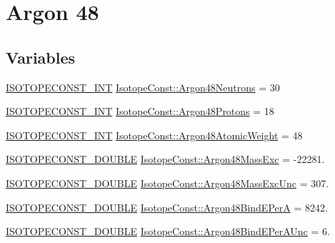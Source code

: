 \hypertarget{group___isotope_const-_argon-_ar48}{}\section{Argon 48}
\label{group___isotope_const-_argon-_ar48}
\subsection*{Variables}
\begin{DoxyCompactItemize}
\item 
\mbox{\hyperlink{group___isotope_const-_macros_ga5f18360b3e99483a35c32d789e62621c}{I\+S\+O\+T\+O\+P\+E\+C\+O\+N\+S\+T\+\_\+\+I\+NT}} \mbox{\hyperlink{group___isotope_const-_argon-_ar48_gad60127c6b7b8150efa4f4d6e5371e982}{Isotope\+Const\+::\+Argon48\+Neutrons}} = 30
\item 
\mbox{\hyperlink{group___isotope_const-_macros_ga5f18360b3e99483a35c32d789e62621c}{I\+S\+O\+T\+O\+P\+E\+C\+O\+N\+S\+T\+\_\+\+I\+NT}} \mbox{\hyperlink{group___isotope_const-_argon-_ar48_ga970cd0a221ec47e15054ea664ed58d0b}{Isotope\+Const\+::\+Argon48\+Protons}} = 18
\item 
\mbox{\hyperlink{group___isotope_const-_macros_ga5f18360b3e99483a35c32d789e62621c}{I\+S\+O\+T\+O\+P\+E\+C\+O\+N\+S\+T\+\_\+\+I\+NT}} \mbox{\hyperlink{group___isotope_const-_argon-_ar48_ga29a5041209f022d6c771689913a5384a}{Isotope\+Const\+::\+Argon48\+Atomic\+Weight}} = 48
\item 
\mbox{\hyperlink{group___isotope_const-_macros_ga8f45a7272ce02c0b4c65c44636ed719a}{I\+S\+O\+T\+O\+P\+E\+C\+O\+N\+S\+T\+\_\+\+D\+O\+U\+B\+LE}} \mbox{\hyperlink{group___isotope_const-_argon-_ar48_ga8fa3413c8b3fe44722eef51066379e60}{Isotope\+Const\+::\+Argon48\+Mass\+Exc}} = -\/22281.
\item 
\mbox{\hyperlink{group___isotope_const-_macros_ga8f45a7272ce02c0b4c65c44636ed719a}{I\+S\+O\+T\+O\+P\+E\+C\+O\+N\+S\+T\+\_\+\+D\+O\+U\+B\+LE}} \mbox{\hyperlink{group___isotope_const-_argon-_ar48_gac31af41a03ff7ecce4bf0e80b9987601}{Isotope\+Const\+::\+Argon48\+Mass\+Exc\+Unc}} = 307.
\item 
\mbox{\hyperlink{group___isotope_const-_macros_ga8f45a7272ce02c0b4c65c44636ed719a}{I\+S\+O\+T\+O\+P\+E\+C\+O\+N\+S\+T\+\_\+\+D\+O\+U\+B\+LE}} \mbox{\hyperlink{group___isotope_const-_argon-_ar48_ga0d43bb6e74dbf51c4f727ab526a1605e}{Isotope\+Const\+::\+Argon48\+Bind\+E\+PerA}} = 8242.
\item 
\mbox{\hyperlink{group___isotope_const-_macros_ga8f45a7272ce02c0b4c65c44636ed719a}{I\+S\+O\+T\+O\+P\+E\+C\+O\+N\+S\+T\+\_\+\+D\+O\+U\+B\+LE}} \mbox{\hyperlink{group___isotope_const-_argon-_ar48_gaea30594203a4d83255eb481d85a84a52}{Isotope\+Const\+::\+Argon48\+Bind\+E\+Per\+A\+Unc}} = 6.

\end{DoxyCompactItemize}
